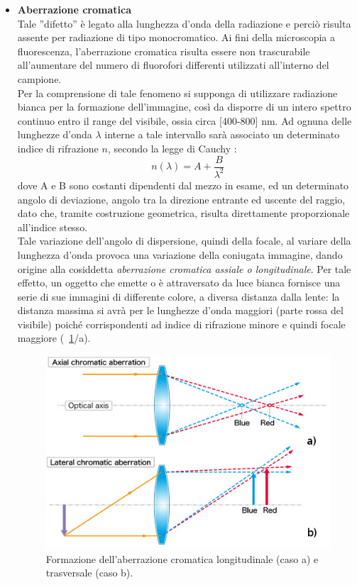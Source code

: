 \begin{itemize}
\item \textbf{Aberrazione cromatica}\\
Tale ''difetto'' è legato alla lunghezza d'onda della radiazione e perciò risulta assente per radiazione di tipo monocromatico. Ai fini della microscopia a fluorescenza, l'aberrazione cromatica risulta essere non trascurabile all'aumentare del numero di fluorofori differenti utilizzati all'interno del campione.\\
Per la comprensione di tale fenomeno si supponga di utilizzare radiazione bianca per la formazione dell'immagine, così da disporre di un intero spettro continuo entro il range del visibile, ossia circa [400-800] nm. Ad ognuna delle lunghezze d'onda $\lambda$ interne a tale intervallo sarà associato un determinato indice di rifrazione $n$, secondo la legge di Cauchy \cite{nigro}:
$$n(\lambda) = A + \frac{B}{\lambda ^2}$$
dove A e B sono costanti dipendenti dal mezzo in esame, ed un determinato angolo di deviazione, angolo tra la direzione entrante ed uscente del raggio, dato che, tramite costruzione geometrica, risulta direttamente proporzionale all'indice stesso. \\
Tale variazione dell'angolo di dispersione, quindi della focale, al variare della lunghezza d'onda provoca una variazione della coniugata immagine, dando origine alla cosiddetta \textit{aberrazione cromatica assiale o longitudinale}. Per tale effetto, un oggetto che emette o è attraversato da luce bianca fornisce una serie di sue immagini di differente colore, a diversa distanza dalla lente: la distanza massima si avrà per le lunghezze d'onda maggiori (parte rossa del visibile) poiché corrispondenti ad indice di rifrazione minore e quindi focale maggiore (\figurename~\ref{fig:ac}/a). 

\begin{figure}[!ht]
 \centering
 \includegraphics[scale=.50]{img/CAP2ac.jpg}
 \caption{\small{Formazione dell'aberrazione cromatica longitudinale (caso a) e trasversale (caso b).}}
 \label{fig:ac}
\end{figure}


\end{itemize}
